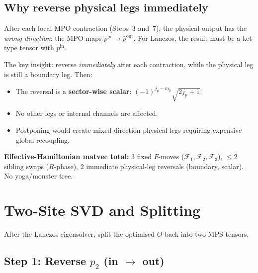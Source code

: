 \documentclass[11pt,a4paper]{article}
\newcommand{\Fmove}{\mathcal{F}}
\begin{document}
\subsection*{Why reverse physical legs immediately}

After each local MPO contraction (Steps~3 and~7), the physical output has the
\emph{wrong direction}: the MPO maps $p^{\mathrm{in}} \to \bar{p}^{\mathrm{out}}$.
For Lanczos, the result must be a ket-type tensor with $p^{\mathrm{in}}$.

The key insight: reverse \emph{immediately} after each contraction, while the
physical leg is still a boundary leg.  Then:
\begin{itemize}[nosep]
  \item The reversal is a \textbf{sector-wise scalar}: $(-1)^{j_p - m_p}\sqrt{2j_p+1}$.
  \item No other legs or internal channels are affected.
  \item Postponing would create mixed-direction physical legs requiring expensive global recoupling.
\end{itemize}

\begin{costbox}
\textbf{Effective-Hamiltonian matvec total:}
3 fixed $F$-moves ($\Fmove_1, \Fmove_2, \Fmove_3$),
$\le 2$ sibling swaps ($R$-phase),
2 immediate physical-leg reversals (boundary, scalar).
No yoga/monster tree.
\end{costbox}


\section{Two-Site SVD and Splitting}
\label{sec:svd}

After the Lanczos eigensolver, split the optimised $\Theta$ back into two MPS tensors.

\subsection*{Step 1: Reverse $p_2$ (in $\to$ out)}
\end{document}

